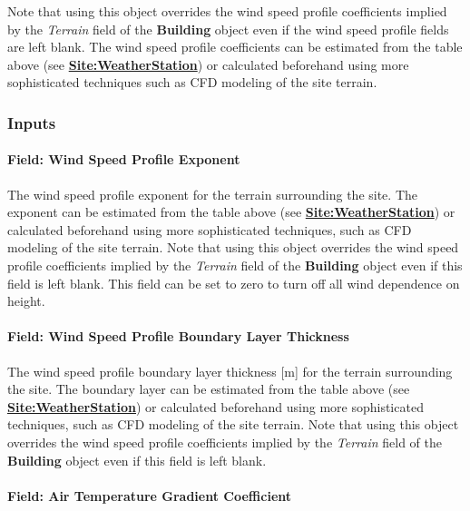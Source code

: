 Note that using this object overrides the wind speed profile coefficients implied by the \emph{Terrain} field of the \textbf{Building} object even if the wind speed profile fields are left blank. The wind speed profile coefficients can be estimated from the table above (see \textbf{\hyperref[siteweatherstation]{Site:WeatherStation}}) or calculated beforehand using more sophisticated techniques such as CFD modeling of the site terrain.

\subsubsection{Inputs}\label{inputs-10-009}

\paragraph{Field: Wind Speed Profile Exponent}\label{field-wind-speed-profile-exponent-1}

The wind speed profile exponent for the terrain surrounding the site. The exponent can be estimated from the table above (see \textbf{\hyperref[siteweatherstation]{Site:WeatherStation}}) or calculated beforehand using more sophisticated techniques, such as CFD modeling of the site terrain. Note that using this object overrides the wind speed profile coefficients implied by the \emph{Terrain} field of the \textbf{Building} object even if this field is left blank. This field can be set to zero to turn off all wind dependence on height.

\paragraph{Field: Wind Speed Profile Boundary Layer Thickness}\label{field-wind-speed-profile-boundary-layer-thickness-1}

The wind speed profile boundary layer thickness {[}m{]} for the terrain surrounding the site. The boundary layer can be estimated from the table above (see \textbf{\hyperref[siteweatherstation]{Site:WeatherStation}}) or calculated beforehand using more sophisticated techniques, such as CFD modeling of the site terrain. Note that using this object overrides the wind speed profile coefficients implied by the \emph{Terrain} field of the \textbf{Building} object even if this field is left blank.

\paragraph{Field: Air Temperature Gradient Coefficient}\label{field-air-temperature-gradient-coefficient}


